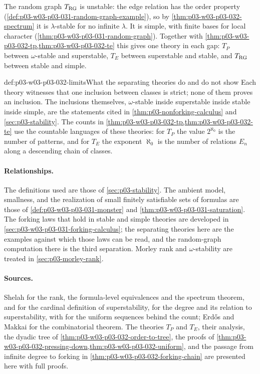 The random graph \(T_{\rm RG}\) is unstable: the edge relation has the order
property (\cref{def:p03-w03-p03-031-random-graph-example}), so by
\cref{thm:p03-w03-p03-032-spectrum} it is \(\lambda\)-stable for no infinite
\(\lambda\).  It is simple, with finite bases for local character
(\cref{thm:p03-w03-p03-031-random-graph}).  Together with
\cref{thm:p03-w03-p03-032-tp,thm:p03-w03-p03-032-te} this gives one theory
in each gap: \(T_P\) between \(\omega\)-stable and superstable, \(T_E\)
between superstable and stable, and \(T_{\rm RG}\) between stable and simple.

\begin{hbwarning}{def:p03-w03-p03-032-limits}{What the separating theories do and do not show}
Each theory witnesses that one inclusion between classes is strict; none of
them proves an inclusion.  The inclusions themselves, \(\omega\)-stable
inside superstable inside stable inside simple, are the statements cited in
\cref{thm:p03-nonforking-calculus} and \cref{sec:p03-stability}.  The
counts in \cref{thm:p03-w03-p03-032-tp,thm:p03-w03-p03-032-te} use the
countable languages of these theories: for \(T_P\) the value \(2^{\aleph_0}\)
is the number of patterns, and for \(T_E\) the exponent \(\aleph_0\) is the
number of relations \(E_n\) along a descending chain of classes.
\end{hbwarning}

\paragraph{Relationships.}
The definitions used are those of \cref{sec:p03-stability}.  The ambient
model, smallness, and the realization of small finitely satisfiable sets of
formulas are those of \cref{def:p03-w03-p03-031-monster} and
\cref{thm:p03-w03-p03-031-saturation}.  The forking laws that hold in stable
and simple theories are developed in \cref{sec:p03-w03-p03-031-forking-calculus};
the separating theories here are the examples against which those laws can be
read, and the random-graph computation there is the third separation.  Morley
rank and \(\omega\)-stability are treated in \cref{sec:p03-morley-rank}.

\paragraph{Sources.}
Shelah \cite[\S~2, pp.~296--305]{Shelah1971Stability} for the rank, the
formula-level equivalences and the spectrum theorem, and \cite[\S~0,
p.~273]{Shelah1971Stability} for the cardinal definition of superstability,
\cite[\S~6, pp.~347--358]{Shelah1971Stability} for the degree and its
relation to superstability, with \cite[Theorem~5.8, p.~340]{Shelah1971Stability}
for the uniform sequences behind the count;
Erd\H{o}s and Makkai \cite[Theorem]{ErdosMakkai1966} for the combinatorial
theorem.  The theories \(T_P\) and \(T_E\), their analysis, the dyadic
tree of \cref{thm:p03-w03-p03-032-order-to-tree}, the proofs of
\cref{thm:p03-w03-p03-032-pressing-down,thm:p03-w03-p03-032-uniform}, and the
passage from infinite degree to forking in
\cref{thm:p03-w03-p03-032-forking-chain} are presented here with full
proofs.
